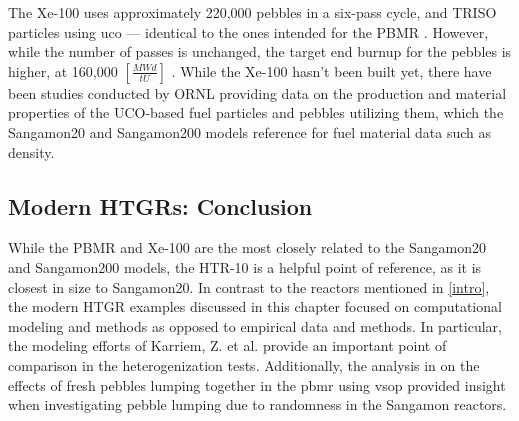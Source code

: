 The Xe-100 uses approximately 220,000 pebbles in a six-pass cycle, and TRISO particles using \acrfull{uco} --- identical to the ones intended for the PBMR \cite{harlan_x-energy_2018}.  However, while the number of passes is unchanged, the target end burnup for the pebbles is higher, at 160,000 $\left[\frac{MWd}{tU}\right]$ \cite{harlan_x-energy_2018}.  While the Xe-100 hasn't been built yet, there have been studies conducted by ORNL providing data on the production and material properties of the UCO-based fuel particles \cite{helmreich_year_2017} and pebbles utilizing them, which the Sangamon20 and Sangamon200 models reference for fuel material data such as density.

\subsection{Modern HTGRs: Conclusion}

While the PBMR and Xe-100 are the most closely related to the Sangamon20 and Sangamon200 models, the HTR-10 is a helpful point of reference, as it is closest in size to Sangamon20.  In contrast to the reactors mentioned in \autoref{intro}, the modern HTGR examples discussed in this chapter focused on computational modeling and methods as opposed to empirical data and methods.  In particular, the modeling efforts of Karriem, Z. et al. \cite{karriem_mcnp_2001} provide an important point of comparison in the heterogenization tests.  Additionally, the analysis in \cite{reitsma_investigation_2005} on the effects of fresh pebbles lumping together in the \acrshort{pbmr} using \acrshort{vsop} provided insight when investigating pebble lumping due to randomness in the Sangamon reactors.